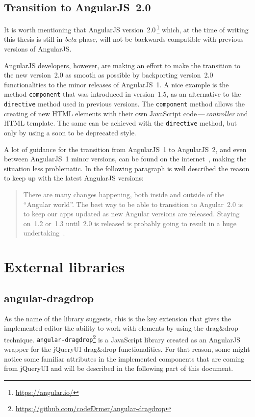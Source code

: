 \subsection{Transition to AngularJS~2.0}

It is worth mentioning that AngularJS
version~2.0\,\footnote{\url{https://angular.io/}} which, at the time of
writing this thesis is still in {\it beta} phase, will not be backwards
compatible with previous versions of AngularJS.

AngularJS developers, however, are making an effort to make the transition to
the new version~2.0 as smooth as possible by backporting version~2.0
functionalities to the minor releases of AngularJS~1.
A nice example is the method {\tt component} that was introduced
in version~1.5, as an alternative to the {\tt directive} method used in
previous versions.
The {\tt component} method allows the creating of new HTML elements with
their own JavaScript code\,---\,{\it controller} and HTML template.
The same can be achieved with the {\tt directive} method, but only by using
a soon to be deprecated style.

A lot of guidance for the transition from AngularJS~1 to AngularJS~2, and
even between AngularJS~1 minor versions, can be found on the
internet~\cite{exploringComponent}, making the situation less problematic.
In the following paragraph is well described the reason to keep up with the
latest AngularJS versions:
\blockquote{There are many changes happening, both inside and outside of the
``Angular world''. The best way to be able to transition to Angular~2.0 is to
keep our apps updated as new Angular versions are released. Staying on~1.2
or~1.3 until~2.0 is released is probably going to result in a huge
undertaking~\cite{prepareToAngular}.}

\section{External libraries}\label{ch:libraries}

\subsection{angular-dragdrop}

As the name of the library suggests, this is the key extension that gives the
implemented editor the ability to work with elements by using the
drag\&drop technique.
{\tt angular-dragdrop}\footnote{\url{https://github.com/codef0rmer/angular-dragdrop}}
is a JavaScript library created as an AngularJS wrapper for the jQueryUI
drag\&drop functionalities.
For that reason, some might notice some
familiar attributes in the implemented components that are coming from jQueryUI
and will be described in the following part of this document.

